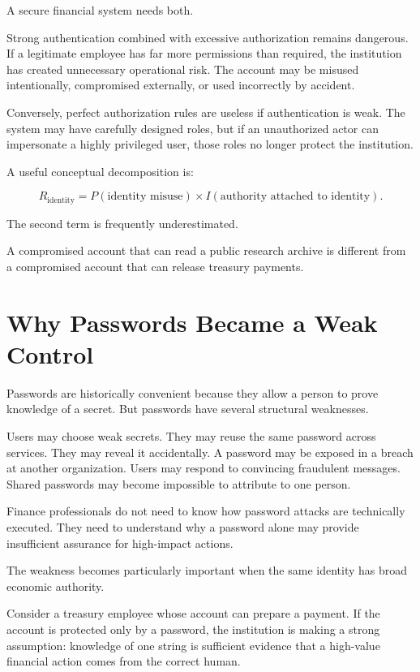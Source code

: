 A secure financial system needs both.

Strong authentication combined with excessive authorization remains dangerous. If a legitimate employee has far more permissions than required, the institution has created unnecessary operational risk. The account may be misused intentionally, compromised externally, or used incorrectly by accident.

Conversely, perfect authorization rules are useless if authentication is weak. The system may have carefully designed roles, but if an unauthorized actor can impersonate a highly privileged user, those roles no longer protect the institution.

A useful conceptual decomposition is:

\begin{equation}
R_{\text{identity}}
=
P(\text{identity misuse})
\times
I(\text{authority attached to identity}).
\end{equation}

The second term is frequently underestimated.

A compromised account that can read a public research archive is different from a compromised account that can release treasury payments.

\section{Why Passwords Became a Weak Control}

Passwords are historically convenient because they allow a person to prove knowledge of a secret. But passwords have several structural weaknesses.

Users may choose weak secrets. They may reuse the same password across services. They may reveal it accidentally. A password may be exposed in a breach at another organization. Users may respond to convincing fraudulent messages. Shared passwords may become impossible to attribute to one person.

Finance professionals do not need to know how password attacks are technically executed. They need to understand why a password alone may provide insufficient assurance for high-impact actions.

The weakness becomes particularly important when the same identity has broad economic authority.

Consider a treasury employee whose account can prepare a payment. If the account is protected only by a password, the institution is making a strong assumption: knowledge of one string is sufficient evidence that a high-value financial action comes from the correct human.

